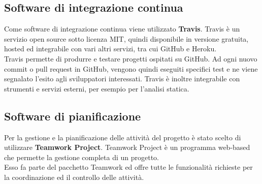 \subsection{Software di integrazione continua}
Come software di integrazione continua viene utilizzato \textbf{Travis}.
Travis è un servizio open source sotto licenza MIT, quindi disponibile in versione gratuita, hosted ed integrabile con vari altri servizi, tra cui GitHub e Heroku.\\ Travis permette di produrre e testare progetti ospitati su GitHub. Ad ogni nuovo commit o pull request in GitHub, vengono quindi eseguiti specifici test e ne viene segnalato l'esito agli sviluppatori interessati. Travis è inoltre integrabile con strumenti e servizi esterni, per esempio per l'analisi statica.

\subsection{Software di pianificazione} \label{sec:teamwork}
Per la gestione e la pianificazione delle attività del progetto è stato scelto di utilizzare \textbf{Teamwork Project}. Teamwork Project è un programma web-based che permette la gestione completa di un progetto.\\
Esso fa parte del pacchetto Teamwork ed offre tutte le funzionalità richieste per la coordinazione ed il controllo delle attività.

